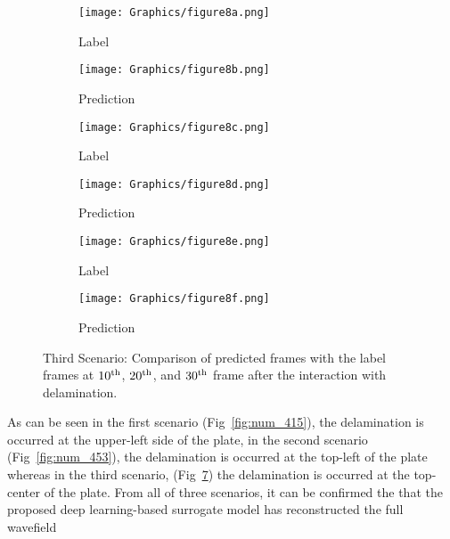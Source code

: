 \begin{figure} []
	\centering
	\begin{subfigure}[b]{0.44\textwidth}
		\centering
		\texttt{[image: Graphics/figure8a.png]}
		\caption{Label}
		\label{fig:num_462_label1}
	\end{subfigure}
	\hfill
	\begin{subfigure}[b]{0.44\textwidth}
		\centering
		\texttt{[image: Graphics/figure8b.png]} 
		\caption{Prediction}
		\label{fig:num_462_pred1}
	\end{subfigure}
	\hfill
	\begin{subfigure}[b]{0.44\textwidth}
		\centering
		\texttt{[image: Graphics/figure8c.png]}
		\caption{Label}
		\label{fig:num_462_label2}
	\end{subfigure}
	\hfill
	\begin{subfigure}[b]{0.44\textwidth}
		\centering
		\texttt{[image: Graphics/figure8d.png]}
		\caption{Prediction}
		\label{fig:num_462_pred2}
	\end{subfigure}
	\hfill
	\begin{subfigure}[b]{0.44\textwidth}
		\centering
		\texttt{[image: Graphics/figure8e.png]}
		\caption{Label}
		\label{fig:num_462_label3}
	\end{subfigure}
	\hfill	
	\begin{subfigure}[b]{0.44\textwidth}
		\centering
		\texttt{[image: Graphics/figure8f.png]}
		\caption{Prediction }
		\label{fig:num_462_pred3}
	\end{subfigure}
	\hfill	
	\caption{Third Scenario: Comparison of predicted frames with the label 
		frames at $10\textsuperscript{th}$, $20\textsuperscript{th}$, and 
		$30\textsuperscript{th}$ frame after the interaction with delamination.}
	\label{fig:num_462}
\end{figure}
As can be seen in the first scenario (Fig~\ref{fig:num_415}), the delamination 
is occurred at the upper-left side of the plate, in the second scenario 
(Fig~\ref{fig:num_453}), the delamination is occurred at the top-left of the 
plate whereas in the third scenario, (Fig~\ref{fig:num_462}) the 
delamination is occurred at the top-center of the plate. 
From all of three scenarios, it can be confirmed the that the proposed 
deep learning-based surrogate model has reconstructed the full wavefield 
